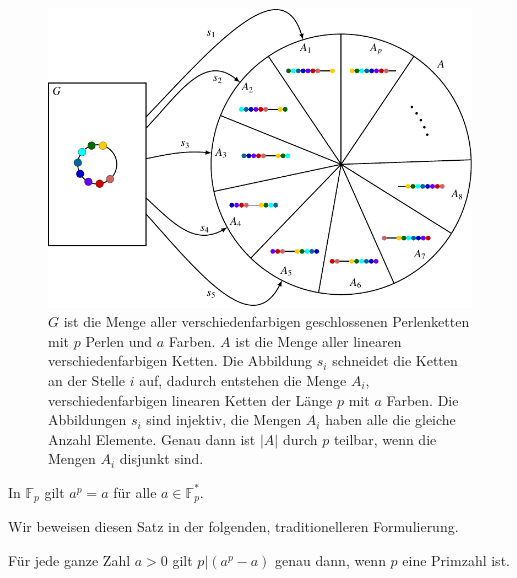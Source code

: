 \begin{figure}
\centering
\includegraphics{chapters/30-endlichekoerper/images/fermat.pdf}
\caption{$G$ ist die Menge aller verschiedenfarbigen geschlossenen
Perlenketten mit $p$ Perlen und $a$ Farben.
$A$ ist die Menge aller linearen verschiedenfarbigen Ketten.
Die Abbildung $s_i$ schneidet die Ketten an der Stelle $i$ auf,
dadurch entstehen die Menge $A_i$, verschiedenfarbigen linearen
Ketten der Länge $p$ mit $a$ Farben.
Die Abbildungen $s_i$ sind injektiv, die Mengen $A_i$ haben alle
die gleiche Anzahl Elemente.
Genau dann ist $|A|$ durch $p$ teilbar, wenn die Mengen $A_i$
disjunkt sind.
\label{buch:endliche-koerper:fig:fermat}}
\end{figure}

\begin{satz}
\label{buch:endliche-koerper:satz:fermat}
In $\mathbb{F}_p$ gilt $a^p=a$ für alle $a\in\mathbb{F}_p^*$.
\end{satz}

Wir beweisen diesen Satz in der folgenden, traditionelleren 
Formulierung.

\begin{satz}
Für jede ganze Zahl $a>0$ gilt $p|(a^p-a)$ genau dann, wenn
$p$ eine Primzahl ist.
\end{satz}

